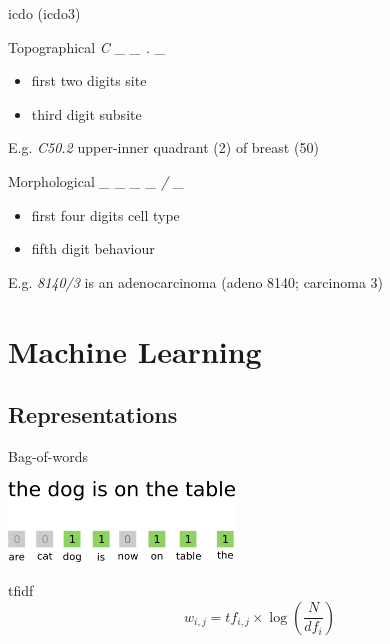 \begin{frame}{\acl{icdo} (\acs{icdo3})}
  \begin{block}{Topographical}
    \alert{\emph{C \_ \_ . \_}}
    \begin{itemize}
    \item first two digits \alert{site}
    \item third digit \alert{subsite}
    \end{itemize}
    E.g. \emph{C50.2} upper-inner quadrant (2) of breast (50)
  \end{block}
  \begin{block}{Morphological}
    \alert{\emph{\_ \_ \_ \_ / \_}}
    \begin{itemize}
    \item first four digits \alert{cell type}
    \item fifth digit \alert{behaviour}
    \end{itemize}
    E.g. \emph{8140/3} is an adenocarcinoma (adeno 8140;
    carcinoma 3)
  \end{block}
\end{frame}

\section{Machine Learning}

\subsection{Representations}

\begin{frame}{Bag-of-words}
  \begin{center}
    \includegraphics[width=0.45\textwidth]{img/bow.png}
  \end{center}
  \begin{block}{\acf{tfidf}}
    \begin{equation*}
      w_{i,j} = tf_{i,j}\times \log\left(\frac{N}{df_i}\right)
    \end{equation*}
  \end{block}
\end{frame}

